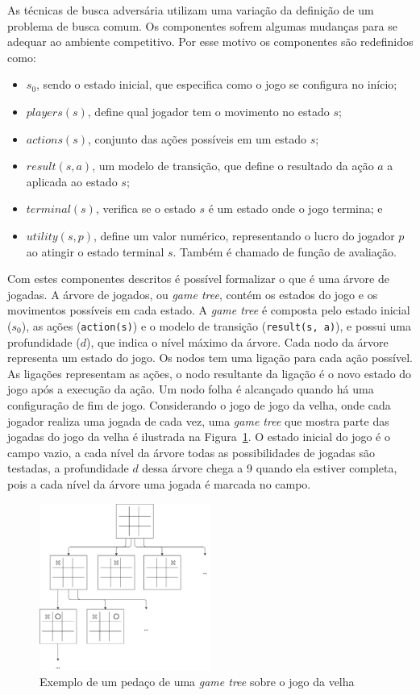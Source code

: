 As técnicas de busca adversária utilizam uma variação da definição de um problema de busca comum. 
Os componentes sofrem algumas mudanças para se adequar ao ambiente competitivo.
Por esse motivo os componentes são redefinidos como:

\begin{itemize}
	\item $s_{0}$, sendo o estado inicial, que especifica como o jogo se configura no início;
	\item $players(s)$, define qual jogador tem o movimento no estado $s$;
	\item $actions(s)$, conjunto das ações possíveis em um estado $s$;
	\item $result(s, a)$, um modelo de transição, que define o resultado da ação $a$ a aplicada ao estado $s$;
	\item $terminal(s)$, verifica se o estado $s$ é um estado onde o jogo termina; e
	\item $utility(s,p)$, define um valor numérico, representando o lucro do jogador $p$ ao atingir o estado terminal $s$. Também é chamado de função de avaliação.
\end{itemize}

Com estes componentes descritos é possível formalizar o que é uma árvore de jogadas. 
A árvore de jogados, ou \textit{game tree}, contém os estados do jogo e os movimentos possíveis em cada estado. 
A \textit{game tree} é composta pelo estado inicial ($s_{0}$), as ações (\texttt{action(s)}) e o modelo de transição (\texttt{result(s, a)}), e possui uma profundidade ($d$), que indica o nível máximo da árvore. 
Cada nodo da árvore representa um estado do jogo. 
Os nodos tem uma ligação para cada ação possível. As ligações representam as ações, o nodo resultante da ligação é o novo estado do jogo após a execução da ação.
Um nodo folha é alcançado quando há uma configuração de fim de jogo.
Considerando o jogo de jogo da velha, onde cada jogador realiza uma jogada de cada vez, uma \textit{game tree} que mostra parte das jogadas do jogo da velha é ilustrada na Figura~\ref{fig:jogodavelha}. 
O estado inicial do jogo é o campo vazio, a cada nível da árvore todas as possibilidades de jogadas são testadas, a profundidade $d$ dessa árvore chega a 9 quando ela estiver completa, pois a cada nível da árvore uma jogada é marcada no campo. 

\begin{figure}[ht]
	\centering
	\includegraphics[width=0.5\textwidth]{fig/jogodavelha.pdf}
	\caption{Exemplo de um pedaço de uma \textit{game tree} sobre o jogo da velha}
	\label{fig:jogodavelha}
\end{figure} 

